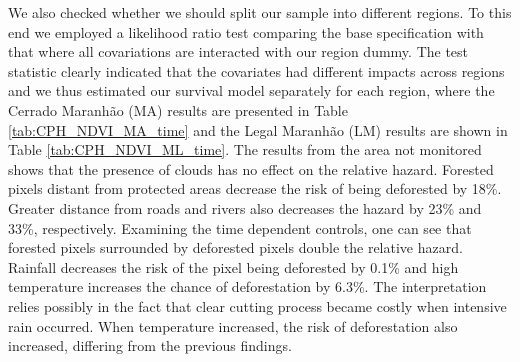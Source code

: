 We also checked whether we should split our sample into different regions. To this end we employed a likelihood ratio test comparing the base specification with that where all covariations are interacted with our region dummy.  The test statistic clearly indicated that the covariates had different impacts across regions and we thus estimated our survival model separately for each region, where the Cerrado Maranhão (MA) results are presented in Table \ref{tab:CPH_NDVI_MA_time} and the Legal Maranhão (LM) results are shown in Table \ref{tab:CPH_NDVI_ML_time}. The results from the area not monitored shows that the presence of clouds has no effect on the relative hazard. Forested pixels distant from protected areas decrease the risk of being deforested by 18\%. Greater distance from roads and rivers also decreases the hazard by 23\% and 33\%, respectively. Examining the time dependent controls, one can see that forested pixels surrounded by deforested pixels double the relative hazard. Rainfall decreases the risk of the pixel being deforested by 0.1\% and high temperature increases the chance of deforestation by 6.3\%. The interpretation relies possibly in the fact that clear cutting process became costly when intensive rain occurred. When temperature increased, the risk of deforestation also increased, differing from the previous findings.

